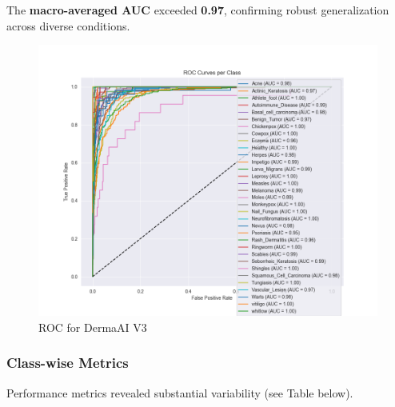 \documentclass[
  12pt,
  oneside]{article}
\begin{document}
The \textbf{macro-averaged AUC} exceeded \textbf{0.97}, confirming
robust generalization across diverse conditions.

\begin{figure}

{\centering \includegraphics[width=0.8\linewidth]{roc_curves} 

}

\caption{ROC for DermaAI V3}\label{fig:unnamed-chunk-19}
\end{figure}

\subsubsection{Class-wise Metrics}\label{class-wise-metrics}

Performance metrics revealed substantial variability (see Table below).
\end{document}
